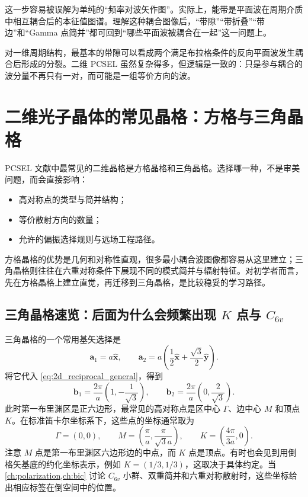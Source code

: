这一步容易被误解为单纯的“频率对波矢作图”。实际上，能带是平面波在周期介质中相互耦合后的本征值图谱。理解这种耦合图像后，“带隙”“带折叠”“带边”和“Gamma 点简并”都可回到“哪些平面波被耦合在一起”这一问题上。

对一维周期结构，最基本的带隙可以看成两个满足布拉格条件的反向平面波发生耦合后形成的分裂。二维 PCSEL 虽然复杂得多，但逻辑是一致的：只是参与耦合的波分量不再只有一对，而可能是一组等价方向的波。

\section{二维光子晶体的常见晶格：方格与三角晶格}
PCSEL 文献中最常见的二维晶格是方格晶格和三角晶格。选择哪一种，不是审美问题，而会直接影响：
\begin{itemize}
  \item 高对称点的类型与简并结构；
  \item 等价散射方向的数量；
  \item 允许的偏振选择规则与远场工程路径。
\end{itemize}

方格晶格的优势是几何和对称性直观，很多最小耦合波图像都容易从这里建立；三角晶格则往往在六重对称条件下展现不同的模式简并与辐射特征。对初学者而言，先在方格晶格上建立直觉，再迁移到三角晶格，是比较稳妥的学习路径。

\subsection{三角晶格速览：后面为什么会频繁出现 \texorpdfstring{$K$}{K} 点与 \texorpdfstring{$C_{6v}$}{C6v}}
三角晶格的一个常用基矢选择是
\begin{equation}
\bm a_1 = a\hat{\bm x},
\qquad
\bm a_2 = a\left(\frac{1}{2}\hat{\bm x}+\frac{\sqrt{3}}{2}\hat{\bm y}\right).
\label{eq:triangular_real_basis}
\end{equation}
将它代入 \cref{eq:2d_reciprocal_general}，得到
\begin{equation}
\bm b_1 = \frac{2\pi}{a}\left(1,-\frac{1}{\sqrt{3}}\right),
\qquad
\bm b_2 = \frac{2\pi}{a}\left(0,\frac{2}{\sqrt{3}}\right).
\label{eq:triangular_reciprocal_basis}
\end{equation}
此时第一布里渊区是正六边形，最常见的高对称点是区中心 $\Gamma$、边中心 $M$ 和顶点 $K$。在标准笛卡尔坐标系下，这些点的坐标通常取为
\begin{equation}
\Gamma = (0,0),
\qquad
M = \left(\frac{\pi}{a},\frac{\pi}{\sqrt{3}a}\right),
\qquad
K = \left(\frac{4\pi}{3a},0\right).
\label{eq:triangular_high_symmetry_points}
\end{equation}
注意 $M$ 点是第一布里渊区六边形边的中点，而 $K$ 点是顶点。有时也会见到用倒格矢基底的约化坐标表示，例如 $K=(1/3,1/3)$，这取决于具体约定。当 \cref{ch:polarization,ch:bic} 讨论 $C_{6v}$ 小群、双重简并和六重对称散射时，这些坐标给出相应标签在倒空间中的位置。

